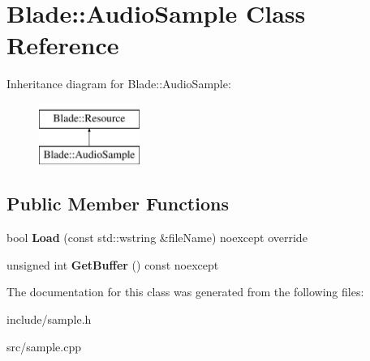 \hypertarget{class_blade_1_1_audio_sample}{}\section{Blade\+:\+:Audio\+Sample Class Reference}
\label{class_blade_1_1_audio_sample}
Inheritance diagram for Blade\+:\+:Audio\+Sample\+:\begin{figure}[H]
\begin{center}
\leavevmode
\includegraphics[height=2.000000cm]{class_blade_1_1_audio_sample}
\end{center}
\end{figure}
\subsection*{Public Member Functions}
\begin{DoxyCompactItemize}
\item 
\mbox{\label{class_blade_1_1_audio_sample_a27bc4a11067251a2c820f1e3096bb812}} 
bool {\bfseries Load} (const std\+::wstring \&file\+Name) noexcept override
\item 
\mbox{\label{class_blade_1_1_audio_sample_aa3d39cda7e85c59924022e17272dbb26}} 
unsigned int {\bfseries Get\+Buffer} () const noexcept
\end{DoxyCompactItemize}


The documentation for this class was generated from the following files\+:\begin{DoxyCompactItemize}
\item 
include/sample.\+h\item 
src/sample.\+cpp\end{DoxyCompactItemize}
